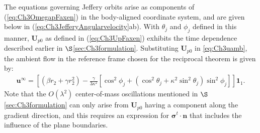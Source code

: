 \documentclass{jfm}
\begin{document}
The equations governing Jeffery orbits arise as components of (\ref{eq:Ch3OmegapFaxen}) in the body-aligned coordinate system, and are given below in (\ref{eq:Ch3JefferyAngularvelocity}ab). With $\theta_j$ and $\phi_j$ defined in this manner, $\bm{U}_{p0}$ as defined in (\ref{eq:Ch3UpFaxen}) exhibits the time dependence described earlier in $\S$\ref{sec:Ch3formulation}. Substituting $\bm{U}_{p0}$ in \eqref{eq:Ch3uamb}, the ambient flow in the  reference frame chosen for the reciprocal theorem is given by:
\begin{align}
\bm{u}^\infty=\left[ (\beta r_2 +\gamma r_2^2)-\frac{\gamma}{3\kappa^2}[\cos^2\phi_j+(\cos^2\theta_j+\kappa^2\sin^2\theta_j)\sin^2\phi_j] \right] \bm{1}_1.
\label{eq:VambFaxen}
\end{align}
Note that the $O(\lambda^2)$ center-of-mass oscillations mentioned in $\S$\ref{sec:Ch3formulation} can only arise from $\bm{U}_{p0}$ having a component along the gradient direction, and this requires an expression for $\bm{\sigma}^t \cdot \bm{n}$ that includes the influence of the plane boundaries.
\end{document}
